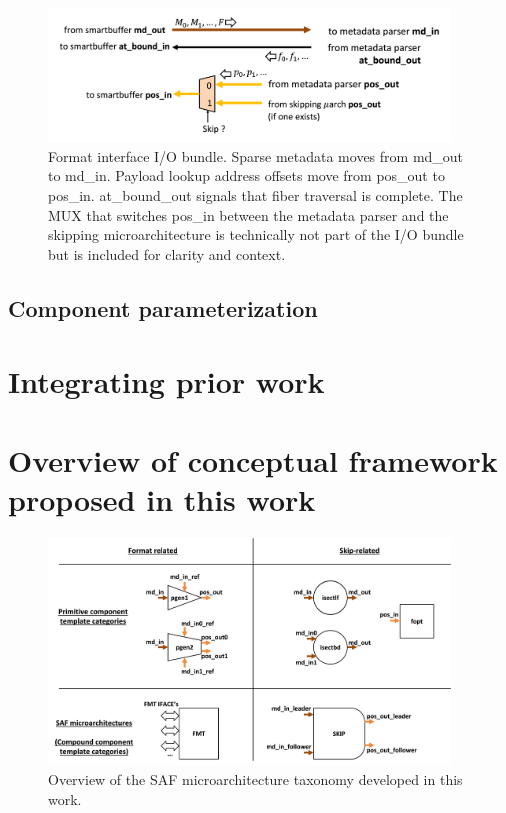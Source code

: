 \begin{figure}[ht]
    \centering
    \includegraphics[width=0.95\textwidth]{figures/format_interface.png}
    \caption{Format interface I/O bundle. Sparse metadata moves from md\_out to md\_in. Payload lookup address offsets move from pos\_out to pos\_in. at\_bound\_out signals that fiber traversal is complete. The MUX that switches pos\_in between the metadata parser and the skipping microarchitecture is technically not part of the I/O bundle but is included for clarity and context.}
    \label{fig:format_interface}
\end{figure}

\subsection{Component parameterization}



\section{Integrating prior work}

\section{Overview of conceptual framework proposed in this work}

\begin{figure}[ht]
    \centering
    \includegraphics[width=0.95\textwidth]{figures/this_work_taxo.png}
    \caption{Overview of the SAF microarchitecture taxonomy developed in this work.}
    \label{fig:this_work_taxo}
\end{figure}

